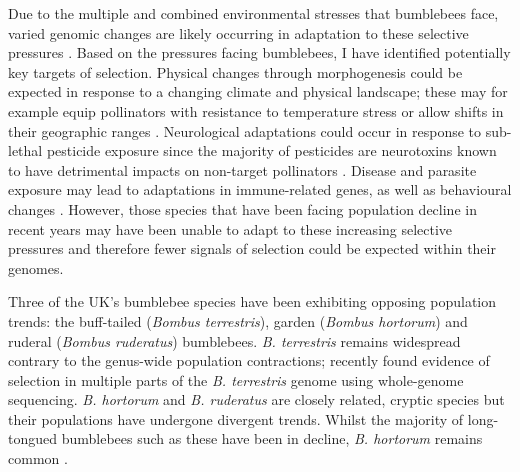\documentclass[12pt]{article}
\begin{document}
\begin{linenumbers}
	
	Due to the multiple and combined environmental stresses that bumblebees face, varied genomic changes are likely occurring in adaptation to these selective pressures \citep{potts_global_2010, colgan_genomic_2022}. 
	Based on the pressures facing bumblebees, I have identified potentially key targets of selection.
	Physical changes through morphogenesis could be expected in response to a changing climate and physical landscape;
	these may for example equip pollinators with resistance to temperature stress or allow shifts in their geographic ranges \citep{jackson_local_2020, maebe_bumblebee_2021}. 
	Neurological adaptations could occur in response to sub-lethal pesticide exposure since the majority of pesticides are neurotoxins known to have detrimental impacts on non-target pollinators
	\citep{siviter_quantifying_2018, bebane_effects_2019, colgan_caste-_2019, roat_using_2020}. 
	Disease and parasite exposure may lead to adaptations in immune-related genes, as well as behavioural changes 
	\citep{fouks_recognition_2011, ellis_patterns_2012}. 
	However, those species that have been facing population decline in recent years may have been unable to adapt to these increasing selective pressures and therefore fewer signals of selection could be expected within their genomes. 
	
	
	Three of the UK's bumblebee species have been exhibiting opposing population trends: the buff-tailed (\emph{Bombus terrestris}), garden (\emph{Bombus hortorum}) and ruderal (\emph{Bombus ruderatus}) bumblebees. 
	\emph{B. terrestris} remains widespread contrary to the genus-wide population contractions; \cite{colgan_genomic_2022} recently found evidence of selection in multiple parts of the \emph{B. terrestris} genome using whole-genome sequencing. \emph{B. hortorum} and \emph{B. ruderatus} are closely related, cryptic species but their populations have undergone divergent trends. Whilst the majority of long-tongued bumblebees such as these have been in decline, \emph{B. hortorum} remains common \citep{ellis_delineating_2005, wood_targeted_2015, maebe_microsatellite_2015}. 



\end{linenumbers}
\end{document}
